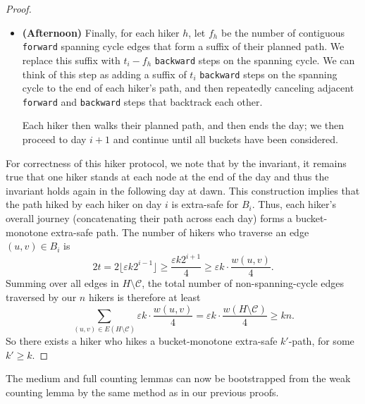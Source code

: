 \documentclass{article}\usepackage[a4paper,margin=20mm]{geometry}
\newcommand{\eps}{\varepsilon}
\newcommand{\cee}{\mathcal{C}}
\newcommand{\forward}{\texttt{forward}}
\newcommand{\backward}{\texttt{backward}}
\begin{document}
\begin{proof}
\begin{itemize}
\item \textbf{(Afternoon)} Finally, for each hiker $h$, let $f_h$ be the number of contiguous \forward{} spanning cycle edges that form a suffix of their planned path.
We replace this suffix with $t_i-f_h$ \backward{} steps on the spanning cycle.
We can think of this step as adding a suffix of $t_i$ \backward{} steps on the spanning cycle to the end of each hiker's path, and then repeatedly canceling adjacent \forward{} and \backward{} steps that backtrack each other.

Each hiker then walks their planned path, and then ends the day; we then proceed to day $i+1$ and continue until all buckets have been considered.
\end{itemize}

For correctness of this hiker protocol, we note that by the invariant, it remains true that one hiker stands at each node at the end of the day and thus the invariant holds again in the following day at dawn.
This construction implies that the path hiked by each hiker on day $i$ is extra-safe for $B_i$.
Thus, each hiker's overall journey (concatenating their path across each day) forms a bucket-monotone extra-safe path.
The number of hikers who traverse an edge $(u, v) \in B_i$ is
$$2t = 2 \lfloor \eps k 2^{i-1} \rfloor \ge \frac{\eps k 2^{i+1}}{4} \ge \eps k \cdot \frac{w(u, v)}{4}.$$
Summing over all edges in $H \setminus \cee$, the total number of non-spanning-cycle edges traversed by our $n$ hikers is therefore at least
$$\sum \limits_{(u, v) \in E(H \setminus \cee)} \eps k \cdot \frac{w(u, v)}{4} = \eps k \cdot \frac{w(H \setminus \cee)}{4} \ge kn.$$
So there exists a hiker who hikes a bucket-monotone extra-safe $k'$-path, for some $k' \ge k$.
\end{proof}

The medium and full counting lemmas can now be bootstrapped from the weak counting lemma by the same method as in our previous proofs.
\end{document}
